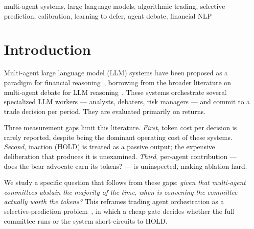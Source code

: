 \documentclass[conference]{IEEEtran}
\begin{document}
\begin{IEEEkeywords}
multi-agent systems, large language models, algorithmic trading,
selective prediction, calibration, learning to defer, agent debate,
financial NLP
\end{IEEEkeywords}

\section{Introduction}

Multi-agent large language model (LLM) systems have been proposed as a
paradigm for financial reasoning~\cite{tradingagents,finagent,finmem},
borrowing from the broader literature on multi-agent debate for LLM
reasoning~\cite{du2023debate,liang2023divergent}. These systems
orchestrate several specialized LLM workers --- analysts, debaters,
risk managers --- and commit to a trade decision per period. They are
evaluated primarily on returns.

Three measurement gaps limit this literature. \emph{First}, token cost
per decision is rarely reported, despite being the dominant operating
cost of these systems. \emph{Second}, inaction (HOLD) is treated as a
passive output; the expensive deliberation that produces it is
unexamined. \emph{Third}, per-agent contribution --- does the bear
advocate earn its tokens? --- is uninspected, making ablation hard.

We study a specific question that follows from these gaps:
\emph{given that multi-agent committees abstain the majority of the
time, when is convening the committee actually worth the tokens?}
This reframes trading agent orchestration as a selective-prediction
problem~\cite{chow1970,geifman2017selective,mozannar2020defer}, in
which a cheap gate decides whether the full committee runs or the
system short-circuits to HOLD.
\end{document}
